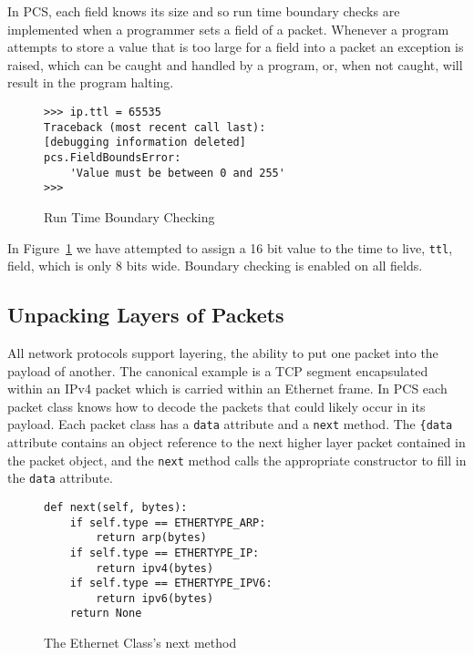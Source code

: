 \documentclass[pdftex]{article}
\begin{document}
In PCS, each field knows its size and so run time boundary checks are
implemented when a programmer sets a field of a packet.  Whenever a
program attempts to store a value that is too large for a field into a
packet an exception is raised, which can be caught and handled by a
program, or, when not caught, will result in the program halting.

\begin{figure}
  \centering
\begin{lstlisting}
>>> ip.ttl = 65535
Traceback (most recent call last):
[debugging information deleted]
pcs.FieldBoundsError: 
    'Value must be between 0 and 255'
>>> 
\end{lstlisting}
\caption{Run Time Boundary Checking}
  \label{fig:run-time-boundary-checking}
\end{figure}

In Figure~\ref{fig:run-time-boundary-checking} we have attempted to
assign a 16 bit value to the time to live, \verb|ttl|, field, which is
only 8 bits wide.  Boundary checking is enabled on all fields.

\subsection{Unpacking Layers of Packets}
\label{sec:unpacking-layers-of-packets}

All network protocols support layering, the ability to put one packet
into the payload of another.  The canonical example is a TCP segment
encapsulated within an IPv4 packet which is carried within an Ethernet
frame.  In PCS each packet class knows how to decode the packets that
could likely occur in its payload.  Each packet class has a
\verb|data| attribute and a \verb|next| method.  The \verb|{data|
attribute contains an object reference to the next higher layer packet
contained in the packet object, and the \verb|next| method 
calls the appropriate constructor to fill in the \verb|data|
attribute.

\begin{figure}
  \centering
\begin{lstlisting}
def next(self, bytes):
    if self.type == ETHERTYPE_ARP:
        return arp(bytes)
    if self.type == ETHERTYPE_IP:
        return ipv4(bytes)
    if self.type == ETHERTYPE_IPV6:
        return ipv6(bytes)
    return None
  \end{lstlisting}
  \caption{The Ethernet Class's next method}
  \label{fig:ethernet-next-method}
\end{figure}
\end{document}
